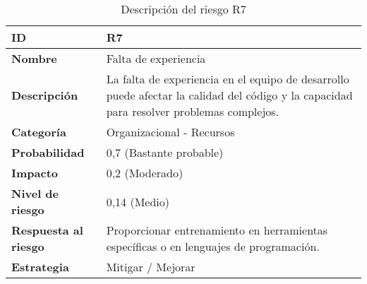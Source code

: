 \begin{table}[H]
	\centering
	\begin{tabular}{|l|m{12cm}|}
		\hline
		\textbf{ID}                  & R7                                                                                                                                       \\
		\hline
		\textbf{Nombre}              & Falta de experiencia                                                                                                                     \\
		\hline
		\textbf{Descripción}         & La falta de experiencia en el equipo de desarrollo puede afectar la calidad del código y la capacidad para resolver problemas complejos. \\
		\hline
		\textbf{Categoría}           & Organizacional - Recursos                                                                                                                \\
		\hline
		\textbf{Probabilidad}        & 0,7 (Bastante probable)                                                                                                                  \\
		\hline
		\textbf{Impacto}             & 0,2 (Moderado)                                                                                                                           \\
		\hline
		\textbf{Nivel de riesgo}     & 0,14 (Medio)                                                                                                                             \\
		\hline
		\textbf{Respuesta al riesgo} & Proporcionar entrenamiento en herramientas específicas o en lenguajes de programación.                                                   \\
		\hline
		\textbf{Estrategia}          & Mitigar / Mejorar                                                                                                                        \\
		\hline
	\end{tabular}
	\caption{Descripción del riesgo R7}
\end{table}

\vspace{0.5cm}

